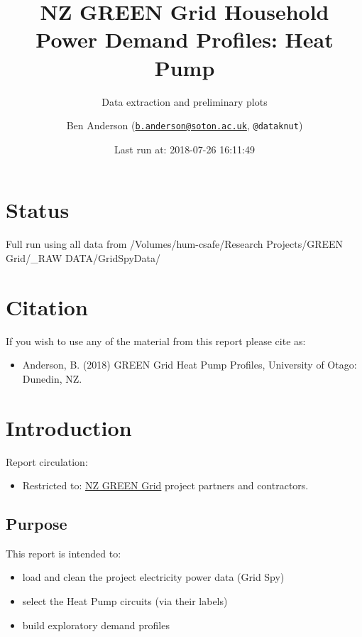 \documentclass[]{article}
\title{NZ GREEN Grid Household Power Demand Profiles: Heat Pump}
\subtitle{Data extraction and preliminary plots}
\author{Ben Anderson
(\href{mailto:b.anderson@soton.ac.uk}{\nolinkurl{b.anderson@soton.ac.uk}},
\texttt{@dataknut})}
\date{Last run at: 2018-07-26 16:11:49}
\providecommand{\tightlist}{%
  \setlength{\itemsep}{0pt}\setlength{\parskip}{0pt}}
\begin{document}
\maketitle

{
\setcounter{tocdepth}{2}
\tableofcontents
}
\newpage

\section{Status}\label{status}

Full run using all data from /Volumes/hum-csafe/Research Projects/GREEN
Grid/\_RAW DATA/GridSpyData/

\section{Citation}\label{citation}

If you wish to use any of the material from this report please cite as:

\begin{itemize}
\tightlist
\item
  Anderson, B. (2018) GREEN Grid Heat Pump Profiles, University of
  Otago: Dunedin, NZ.
\end{itemize}

\newpage

\section{Introduction}\label{introduction}

Report circulation:

\begin{itemize}
\tightlist
\item
  Restricted to:
  \href{https://www.otago.ac.nz/centre-sustainability/research/energy/otago050285.html}{NZ
  GREEN Grid} project partners and contractors.
\end{itemize}

\subsection{Purpose}\label{purpose}

This report is intended to:

\begin{itemize}
\tightlist
\item
  load and clean the project electricity power data (Grid Spy)
\item
  select the Heat Pump circuits (via their labels)
\item
  build exploratory demand profiles
\end{itemize}
\end{document}
